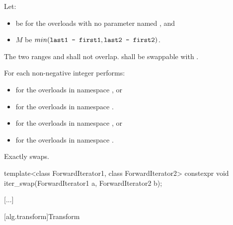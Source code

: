\begin{itemdescr}
{\color{newclr}
\pnum
Let:
\begin{itemize}
\item {} be  for the overloads with
  no parameter named , and
\item $M$ be $min(\texttt{last1 - first1}, \texttt{last2 - first2})$.
\end{itemize}
} %

\pnum
\requires
The two ranges 
and
shall not overlap. 
 shall be swappable with
.

\pnum
\effects
For each non-negative integer
performs: 
{\color{newclr}
\begin{itemize}
\item {} for the overloads in
  namespace , or
\item {} for the overloads
  in namespace .
\end{itemize}
} %

\pnum
\returns {}
{\color{newclr}
\begin{itemize}
\item {} for the overloads in namespace , or
\item {}
for the overloads in namespace .
\end{itemize}
} %

\pnum
\complexity
Exactly
 
swaps.
\end{itemdescr}


%
\begin{itemdecl}
template<class ForwardIterator1, class ForwardIterator2>
  constexpr void iter_swap(ForwardIterator1 a, ForwardIterator2 b);
\end{itemdecl}

[...]

[alg.transform]{Transform}

